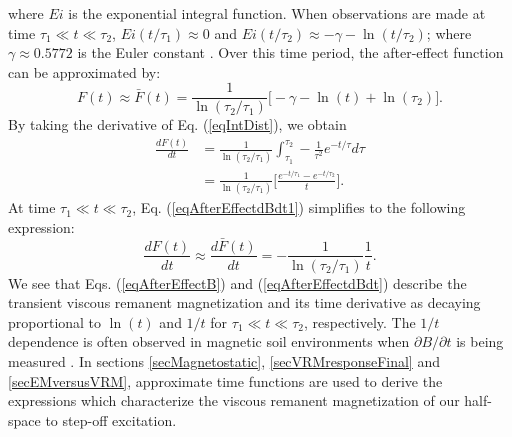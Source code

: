 \documentclass[journal]{IEEEtran}  %
\begin{document}
where $Ei$ is the  exponential integral function. When observations
are made at time $\tau_1 \ll t \ll \tau_2$, $Ei (t/\tau_1) \approx
0$ and $Ei (t/\tau_2) \approx -\gamma - \ln(t/\tau_2)$; where
$\gamma \approx 0.5772$ is the Euler constant \cite{Pasion2007}.
Over this time period, the after-effect function can be approximated
by:
\begin{equation}
\label{eqAfterEffectB} F(t) \approx \bar F(t) =
\frac{1}{\ln(\tau_2/\tau_1)} \big [ - \gamma - \ln(t) + \ln(\tau_2)
\big ].
\end{equation}
By taking the derivative of Eq. (\ref{eqIntDist}), we obtain
\begin{align}
\label{eqAfterEffectdBdt1}
\frac{d F(t)}{dt} &= \frac{1}{\ln(\tau_2/\tau_1)} \int^{\tau_2}_{\tau_1} - \frac{1}{\tau^2} e^{-t/\tau} d \tau \nonumber \\
& = \frac{1}{\ln(\tau_2/\tau_1)} \Bigg [ \frac{e^{-t/\tau_1}
-e^{-t/\tau_2} }{t} \Bigg ].
\end{align}
At time $\tau_1 \ll t \ll \tau_2$, Eq. (\ref{eqAfterEffectdBdt1}) simplifies to the following expression:
\begin{equation}
\label{eqAfterEffectdBdt} \frac{dF(t)}{d t} \approx \frac{d \bar
F(t)}{d t} = -\frac{1}{\ln(\tau_2/\tau_1)} \frac{1}{t}.
\end{equation}
We see that Eqs. (\ref{eqAfterEffectB}) and
(\ref{eqAfterEffectdBdt}) describe the transient  viscous remanent 
magnetization and its time derivative as decaying proportional to $\ln(t)$
and $1/t$ for $\tau_1 \ll t \ll \tau_2$, respectively. The $1/t$
dependence is often observed in magnetic soil environments when
$\partial B/\partial t$ is being measured
\cite{Dabas1992,Buselli1982,Pasion2007}. In sections \ref{secMagnetostatic}, \ref{secVRMresponseFinal} and \ref{secEMversusVRM},
approximate time functions are used to derive the expressions which
characterize the viscous remanent magnetization of our
half-space to step-off excitation.



\end{document}
